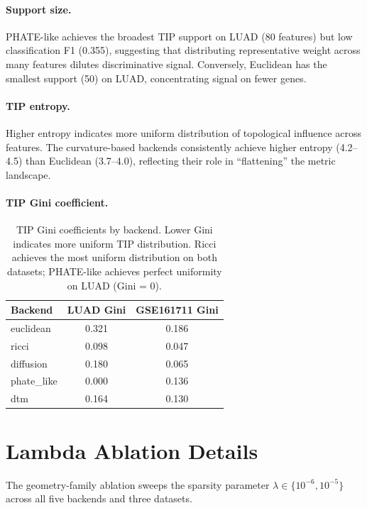 \documentclass[11pt]{article}
\begin{document}
\paragraph{Support size.}
PHATE-like achieves the broadest TIP support on LUAD (80 features) but low classification F1 (0.355), suggesting that distributing representative weight across many features dilutes discriminative signal.
Conversely, Euclidean has the smallest support (50) on LUAD, concentrating signal on fewer genes.

\paragraph{TIP entropy.}
Higher entropy indicates more uniform distribution of topological influence across features.
The curvature-based backends consistently achieve higher entropy (4.2--4.5) than Euclidean (3.7--4.0), reflecting their role in ``flattening'' the metric landscape.

\paragraph{TIP Gini coefficient.}
\begin{table}[h]
\centering
\small
\begin{tabular}{lcc}
\toprule
Backend & LUAD Gini & GSE161711 Gini \\
\midrule
euclidean & 0.321 & 0.186 \\
ricci & 0.098 & 0.047 \\
diffusion & 0.180 & 0.065 \\
phate\_like & 0.000 & 0.136 \\
dtm & 0.164 & 0.130 \\
\bottomrule
\end{tabular}
\caption{TIP Gini coefficients by backend.
Lower Gini indicates more uniform TIP distribution.
Ricci achieves the most uniform distribution on both datasets; PHATE-like achieves perfect uniformity on LUAD (Gini = 0).}
\label{tab:gini}
\end{table}

\section{Lambda Ablation Details}
\label{sec:ablation}

The geometry-family ablation sweeps the sparsity parameter $\lambda \in \{10^{-6}, 10^{-5}\}$ across all five backends and three datasets.
\end{document}
